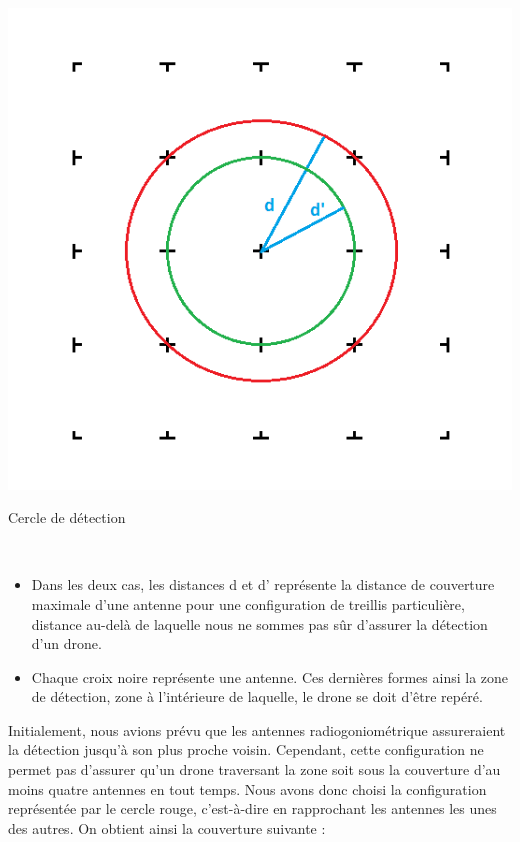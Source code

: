 \begin{minipage}{0.45\linewidth}

  \centering
  \includegraphics[width=\textwidth]{treillis_explication}
  \caption{Cercle de détection}
  ~\\
\end{minipage}
\begin{minipage}{0.45\linewidth}
  \begin{itemize}
  \item Dans les deux cas, les distances d et d’ représente la distance de couverture maximale d’une antenne pour une configuration de treillis particulière, distance au-delà de laquelle nous ne sommes pas sûr d’assurer la détection d’un drone.
  \item Chaque croix noire représente une antenne. Ces dernières formes ainsi la zone de détection, zone à l’intérieure de laquelle, le drone se doit d’être repéré.
  \end{itemize}
\end{minipage}


Initialement, nous avions prévu que les antennes radiogoniométrique assureraient la détection
jusqu’à son plus proche voisin. Cependant, cette configuration ne permet pas d’assurer qu’un drone
traversant la zone soit sous la couverture d’au moins quatre antennes en tout temps. Nous avons
donc choisi la configuration représentée par le cercle rouge, c’est-à-dire en rapprochant les antennes
les unes des autres. On obtient ainsi la couverture suivante :
~\\

